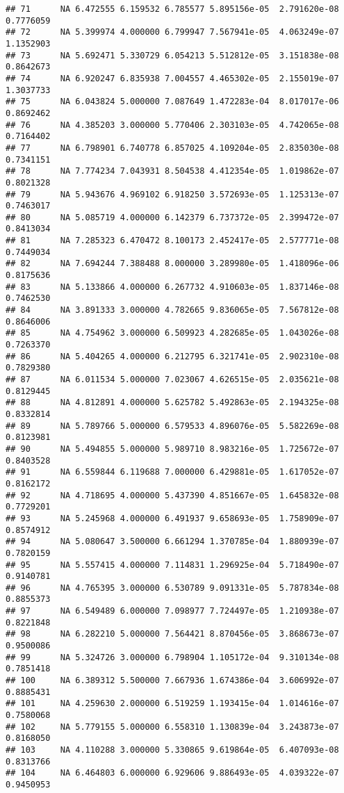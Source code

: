 \documentclass[]{article}
\begin{document}
\begin{verbatim}
## 71      NA 6.472555 6.159532 6.785577 5.895156e-05  2.791620e-08 0.7776059
## 72      NA 5.399974 4.000000 6.799947 7.567941e-05  4.063249e-07 1.1352903
## 73      NA 5.692471 5.330729 6.054213 5.512812e-05  3.151838e-08 0.8642673
## 74      NA 6.920247 6.835938 7.004557 4.465302e-05  2.155019e-07 1.3037733
## 75      NA 6.043824 5.000000 7.087649 1.472283e-04  8.017017e-06 0.8692462
## 76      NA 4.385203 3.000000 5.770406 2.303103e-05  4.742065e-08 0.7164402
## 77      NA 6.798901 6.740778 6.857025 4.109204e-05  2.835030e-08 0.7341151
## 78      NA 7.774234 7.043931 8.504538 4.412354e-05  1.019862e-07 0.8021328
## 79      NA 5.943676 4.969102 6.918250 3.572693e-05  1.125313e-07 0.7463017
## 80      NA 5.085719 4.000000 6.142379 6.737372e-05  2.399472e-07 0.8413034
## 81      NA 7.285323 6.470472 8.100173 2.452417e-05  2.577771e-08 0.7449034
## 82      NA 7.694244 7.388488 8.000000 3.289980e-05  1.418096e-06 0.8175636
## 83      NA 5.133866 4.000000 6.267732 4.910603e-05  1.837146e-08 0.7462530
## 84      NA 3.891333 3.000000 4.782665 9.836065e-05  7.567812e-08 0.8646006
## 85      NA 4.754962 3.000000 6.509923 4.282685e-05  1.043026e-08 0.7263370
## 86      NA 5.404265 4.000000 6.212795 6.321741e-05  2.902310e-08 0.7829380
## 87      NA 6.011534 5.000000 7.023067 4.626515e-05  2.035621e-08 0.8129445
## 88      NA 4.812891 4.000000 5.625782 5.492863e-05  2.194325e-08 0.8332814
## 89      NA 5.789766 5.000000 6.579533 4.896076e-05  5.582269e-08 0.8123981
## 90      NA 5.494855 5.000000 5.989710 8.983216e-05  1.725672e-07 0.8403528
## 91      NA 6.559844 6.119688 7.000000 6.429881e-05  1.617052e-07 0.8162172
## 92      NA 4.718695 4.000000 5.437390 4.851667e-05  1.645832e-08 0.7729201
## 93      NA 5.245968 4.000000 6.491937 9.658693e-05  1.758909e-07 0.8574912
## 94      NA 5.080647 3.500000 6.661294 1.370785e-04  1.880939e-07 0.7820159
## 95      NA 5.557415 4.000000 7.114831 1.296925e-04  5.718490e-07 0.9140781
## 96      NA 4.765395 3.000000 6.530789 9.091331e-05  5.787834e-08 0.8855373
## 97      NA 6.549489 6.000000 7.098977 7.724497e-05  1.210938e-07 0.8221848
## 98      NA 6.282210 5.000000 7.564421 8.870456e-05  3.868673e-07 0.9500086
## 99      NA 5.324726 3.000000 6.798904 1.105172e-04  9.310134e-08 0.7851418
## 100     NA 6.389312 5.500000 7.667936 1.674386e-04  3.606992e-07 0.8885431
## 101     NA 4.259630 2.000000 6.519259 1.193415e-04  1.014616e-07 0.7580068
## 102     NA 5.779155 5.000000 6.558310 1.130839e-04  3.243873e-07 0.8168050
## 103     NA 4.110288 3.000000 5.330865 9.619864e-05  6.407093e-08 0.8313766
## 104     NA 6.464803 6.000000 6.929606 9.886493e-05  4.039322e-07 0.9450953

\end{verbatim}
\end{document}
